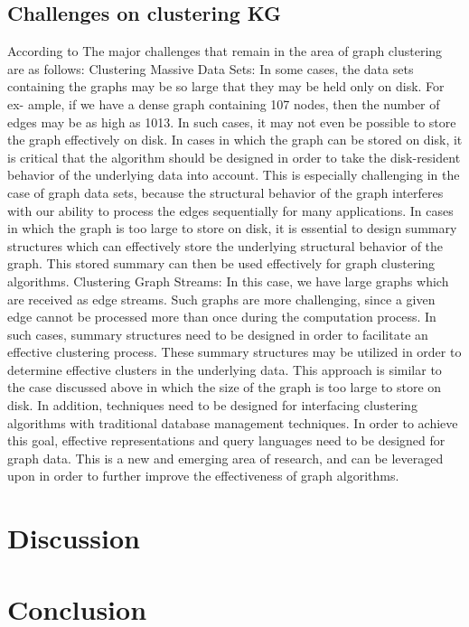 \documentclass[runningheads]{llncs}
\begin{document}
\subsection{Challenges on clustering KG}
According to \cite{Aggarwal} The major challenges that remain in the area of graph clustering are as follows:
Clustering Massive Data Sets: In some cases, the data sets containing the graphs may be so large that they may be held only on disk. For ex- ample, if we have a dense graph containing 107 nodes, then the number of edges may be as high as 1013. In such cases, it may not even be possible to store the graph effectively on disk. In cases in which the graph can be stored on disk, it is critical that the algorithm should be designed in order to take the disk-resident behavior of the underlying data into account. This is especially challenging in the case of graph data sets, because the structural behavior of the graph interferes with our ability to process the edges sequentially for many applications. In cases in which the graph is too large to store on disk, it is essential to design summary structures which can effectively store the underlying structural behavior of the graph. This stored summary can then be used effectively for graph clustering algorithms.
Clustering Graph Streams: In this case, we have large graphs which are received as edge streams. Such graphs are more challenging, since a given edge cannot be processed more than once during the computation process. In such cases, summary structures need to be designed in order to facilitate an effective clustering process. These summary structures may be utilized in order to determine effective clusters in the underlying data. This approach is similar to the case discussed above in which the size of the graph is too large to store on disk.
In addition, techniques need to be designed for interfacing clustering algorithms with traditional database management techniques. In order to achieve this goal, effective representations and query languages need to be designed for graph data. This is a new and emerging area of research, and can be leveraged upon in order to further improve the effectiveness of graph algorithms.
\section{Discussion} \label{discussion}
\section{Conclusion} \label{conclusion}
\end{document}
